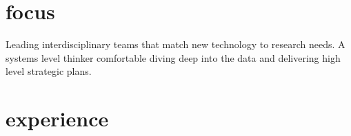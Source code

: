 \documentclass[]{dmc-cv} %
\begin{document}
\section{focus}
Leading interdisciplinary teams that match new technology to research needs. A systems level thinker comfortable diving deep into the data and delivering 
high level strategic plans. 


\section{experience}
\end{document}
